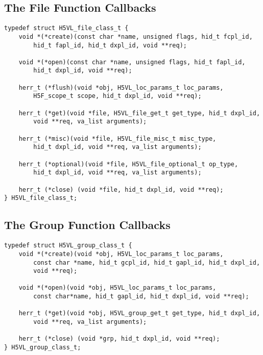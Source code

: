 \documentclass[10pt,a4paper]{article}
\begin{document}
\subsection{The File Function Callbacks}

\begin{lstlisting}
typedef struct H5VL_file_class_t {
    void *(*create)(const char *name, unsigned flags, hid_t fcpl_id,
        hid_t fapl_id, hid_t dxpl_id, void **req);

    void *(*open)(const char *name, unsigned flags, hid_t fapl_id, 
        hid_t dxpl_id, void **req);

    herr_t (*flush)(void *obj, H5VL_loc_params_t loc_params, 
        H5F_scope_t scope, hid_t dxpl_id, void **req);

    herr_t (*get)(void *file, H5VL_file_get_t get_type, hid_t dxpl_id, 
        void **req, va_list arguments);

    herr_t (*misc)(void *file, H5VL_file_misc_t misc_type, 
        hid_t dxpl_id, void **req, va_list arguments);

    herr_t (*optional)(void *file, H5VL_file_optional_t op_type, 
        hid_t dxpl_id, void **req, va_list arguments);

    herr_t (*close) (void *file, hid_t dxpl_id, void **req);
} H5VL_file_class_t;
\end{lstlisting}

\subsection{The Group Function Callbacks}

\begin{lstlisting}
typedef struct H5VL_group_class_t {
    void *(*create)(void *obj, H5VL_loc_params_t loc_params, 
        const char *name, hid_t gcpl_id, hid_t gapl_id, hid_t dxpl_id, 
        void **req);

    void *(*open)(void *obj, H5VL_loc_params_t loc_params, 
        const char*name, hid_t gapl_id, hid_t dxpl_id, void **req);

    herr_t (*get)(void *obj, H5VL_group_get_t get_type, hid_t dxpl_id, 
        void **req, va_list arguments);

    herr_t (*close) (void *grp, hid_t dxpl_id, void **req);
} H5VL_group_class_t;
\end{lstlisting}
\end{document}
